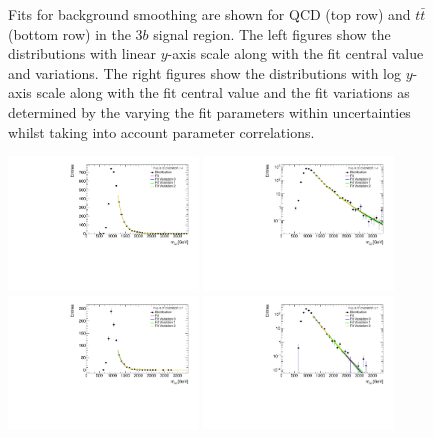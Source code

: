 \begin{figure}[htbp!]
\begin{center}
\caption{Fits for background smoothing are shown for QCD (top row) and $t\bar{t}$ (bottom row) in the $3b$ signal region.  The left figures show the distributions with linear $y$-axis scale along with the fit central value and variations. The right figures show the  distributions with log $y$-axis scale along with the fit central value and the fit variations as determined by the varying the fit parameters within uncertainties whilst taking into account parameter correlations. }
\label{fig:signal-region-3b-smoothing}
\end{center}
\end{figure}

\begin{figure}[htbp!]
\begin{center}
\includegraphics[width=0.45\textwidth,angle=-90]{figures/boosted/Smooth/qcd_est_TwoTag_split_Signal_mHH_l.pdf}
\includegraphics[width=0.45\textwidth,angle=-90]{figures/boosted/Smooth/qcd_est_TwoTag_split_Signal_mHH_l_l.pdf}\\ 
\includegraphics[width=0.45\textwidth,angle=-90]{figures/boosted/Smooth/ttbar_est_TwoTag_split_Signal_mHH_l.pdf}
\includegraphics[width=0.45\textwidth,angle=-90]{figures/boosted/Smooth/ttbar_est_TwoTag_split_Signal_mHH_l_l.pdf}

\end{center}
\end{figure}
